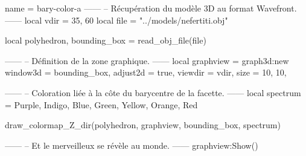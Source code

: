 \documentclass{standalone}
\begin{document}
\begin{luadraw}{name = bary-color-a}
------
-- Récupération du modèle 3D au format Wavefront.
------
local vdir = {35, 60}
local file = "../models/nefertiti.obj"

local polyhedron, bounding_box = read_obj_file(file)

------
-- Définition de la zone graphique.
------
local graphview = graph3d:new{
  window3d = bounding_box,
  adjust2d = true,
  viewdir  = vdir,
  size     = {10, 10},
}

------
-- Coloration liée à la côte du barycentre de la facette.
------
local spectrum = {Purple, Indigo, Blue, Green, Yellow, Orange, Red}

draw_colormap_Z_dir(polyhedron, graphview, bounding_box, spectrum)

------
-- Et le merveilleux se révèle au monde.
------
graphview:Show()
\end{luadraw}
\end{document}
